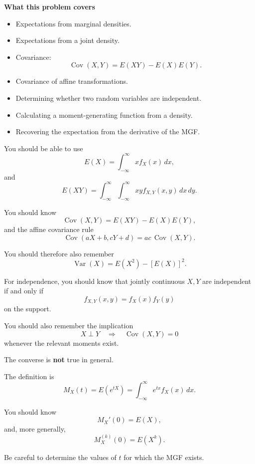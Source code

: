 \documentclass[11pt]{article}
\begin{document}
\begin{topicbox}

\textbf{What this problem covers}

\begin{itemize}[leftmargin=*]
    \item Expectations from marginal densities.
    \item Expectations from a joint density.
    \item Covariance:
    \[
    \operatorname{Cov}(X,Y)
    =
    E(XY)-E(X)E(Y).
    \]
    \item Covariance of affine transformations.
    \item Determining whether two random variables are independent.
    \item Calculating a moment-generating function from a density.
    \item Recovering the expectation from the derivative of the MGF.
\end{itemize}

\end{topicbox}

\begin{toolbox}

You should be able to use
\[
E(X)
=
\int_{-\infty}^{\infty}x f_X(x)\,dx,
\]
and
\[
E(XY)
=
\int_{-\infty}^{\infty}
\int_{-\infty}^{\infty}
xy f_{X,Y}(x,y)\,dx\,dy.
\]

You should know
\[
\operatorname{Cov}(X,Y)
=
E(XY)-E(X)E(Y),
\]
and the affine covariance rule
\[
\operatorname{Cov}(aX+b,cY+d)
=
ac\,\operatorname{Cov}(X,Y).
\]
 

You should therefore also remember
\[
\operatorname{Var}(X)
=
E(X^2)-[E(X)]^2.
\]

For independence, you should know that jointly continuous \(X,Y\) are
independent if and only if
\[
f_{X,Y}(x,y)=f_X(x)f_Y(y)
\]
on the support.

You should also remember the implication
\[
X\perp Y
\quad\Longrightarrow\quad
\operatorname{Cov}(X,Y)=0
\]
whenever the relevant moments exist.

The converse is \textbf{not} true in general.
\end{toolbox}

\begin{toolbox}

The definition is
\[
M_X(t)
=
E(e^{tX})
=
\int_{-\infty}^{\infty}
e^{tx}f_X(x)\,dx.
\]

You should know
\[
M_X'(0)=E(X),
\]
and, more generally,
\[
M_X^{(k)}(0)=E(X^k).
\]

Be careful to determine the values of \(t\) for which the MGF exists.
\end{toolbox}
\end{document}
